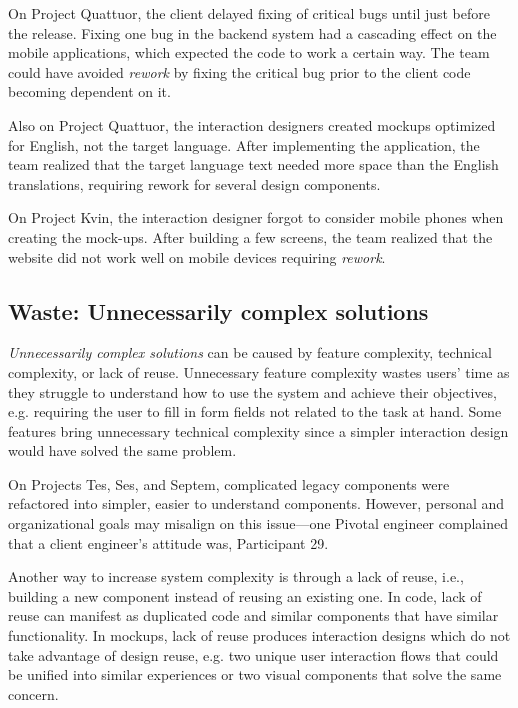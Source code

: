 On Project Quattuor, the client delayed fixing of critical bugs until just before the release. Fixing one bug in the backend system had a cascading effect on the mobile applications, which expected the code to work a certain way. The team could have avoided \textit{rework} by fixing  the critical bug prior to the client code becoming dependent on it.

Also on Project Quattuor, the interaction designers created mockups optimized for English, not the target language. After implementing the application, the team realized that the target language text needed more space than the English translations, requiring rework for several design components. 

On Project Kvin, the interaction designer forgot to consider mobile phones when creating the mock-ups. After building a few screens, the team realized that the website did not work well on mobile devices requiring \textit{rework}.
\subsection{Waste: Unnecessarily complex solutions}
\textit{Unnecessarily complex solutions} can be caused by feature complexity, technical complexity, or lack of reuse. Unnecessary feature complexity wastes users' time as they struggle to understand how to use the system and achieve their objectives, e.g. requiring the user to fill in form fields not related to the task at hand. Some features bring unnecessary technical complexity since a simpler interaction design would have solved the same problem. %

On Projects Tes, Ses, and Septem, complicated legacy components were refactored into simpler, easier to understand components. However, personal and organizational goals may misalign on this issue---one Pivotal engineer complained that a client engineer's attitude was,  \textemdash Participant 29.

Another way to increase system complexity is through a lack of reuse, i.e., building a new component instead of reusing an existing one. In code, lack of reuse can manifest as duplicated code and similar components that have similar functionality. In mockups, lack of reuse produces  interaction designs which do not take advantage of design reuse, e.g. two unique user interaction flows that could be unified into similar experiences or two visual components that solve the same concern.


